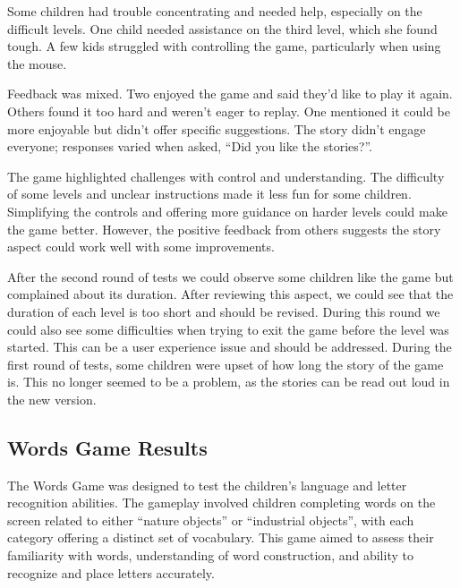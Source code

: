 Some children had trouble concentrating and needed help, especially on the difficult levels. One child needed assistance on the third level, which she found tough. A few kids struggled with controlling the game, particularly when using the mouse.

Feedback was mixed. Two enjoyed the game and said they’d like to play it again. Others found it too hard and weren’t eager to replay. One mentioned it could be more enjoyable but didn’t offer specific suggestions. The story didn’t engage everyone; responses varied when asked, “Did you like the stories?”.

The game highlighted challenges with control and understanding. The difficulty of some levels and unclear instructions made it less fun for some children. Simplifying the controls and offering more guidance on harder levels could make the game better. However, the positive feedback from others suggests the story aspect could work well with some improvements.

After the second round of tests we could observe some children like the game but complained about its duration. After reviewing this aspect, we could see that the duration of each level is too short and should be revised. During this round we could also see some difficulties when trying to exit the game before the level was started. This can be a user experience issue and should be addressed. During the first round of tests, some children were upset of how long the story of the game is. This no longer seemed to be a problem, as the stories can be read out loud in the new version.




\newpage
\subsection{Words Game Results}
The Words Game was designed to test the children's language and letter recognition abilities. The gameplay involved children completing words on the screen related to either ``nature objects'' or ``industrial objects'', with each category offering a distinct set of vocabulary. This game aimed to assess their familiarity with words, understanding of word construction, and ability to recognize and place letters accurately.

